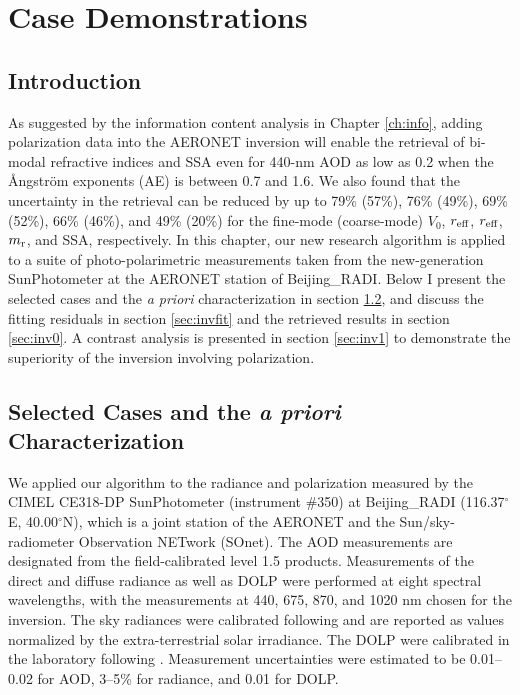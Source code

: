 \chapter{Case Demonstrations} \label{ch:case}

\section{Introduction}

As suggested by the information content analysis in Chapter \ref{ch:info}, 
adding polarization data into the AERONET inversion will enable the 
retrieval of bi-modal refractive indices and SSA even for 440-nm AOD as 
low as 0.2 when the Ångström exponents (AE) is between 0.7 and 1.6. 
We also found that the uncertainty in the retrieval can be reduced by up 
to 79\% (57\%), 76\% (49\%), 69\% (52\%), 66\%
(46\%), and 49\% (20\%) for the fine-mode (coarse-mode) $V_0$, $r_\text{eff}$,
$r_\text{eff}$, $m_\text{r}$, and SSA, respectively. 
In this chapter, our new research algorithm is applied to a suite of 
photo-polarimetric measurements taken from the new-generation SunPhotometer 
at the AERONET station of Beijing\_RADI. Below I present the selected cases and the
\textit{a priori} characterization in section \ref{sec:case}, and discuss the 
fitting residuals in section \ref{sec:invfit} and the retrieved 
results in section \ref{sec:inv0}. A contrast analysis is presented in section
\ref{sec:inv1} to demonstrate the superiority of the 
inversion involving polarization.

\section{Selected Cases and the \textit{a priori} Characterization}
\label{sec:case}

We applied our algorithm to the radiance and polarization measured by the CIMEL
CE318-DP SunPhotometer (instrument \#350) at Beijing\_RADI (116.37$^\circ$E,
40.00$^\circ$N), which is a joint station of the AERONET and the 
Sun/sky-radiometer Observation NETwork (SOnet). The AOD measurements are 
designated from the field-calibrated level 1.5 products. Measurements of the 
direct and diffuse radiance as well as DOLP were performed at eight spectral 
wavelengths, with the measurements at 440, 675, 870, and 1020 nm chosen for 
the inversion. The sky radiances were calibrated following \citet{Li08} and 
are reported as values normalized by the extra-terrestrial solar irradiance. 
The DOLP were calibrated in the laboratory following \citet{Li10}. 
Measurement uncertainties were estimated to be 0.01--0.02 for AOD, 3--5\% for 
radiance, and 0.01 for DOLP.

